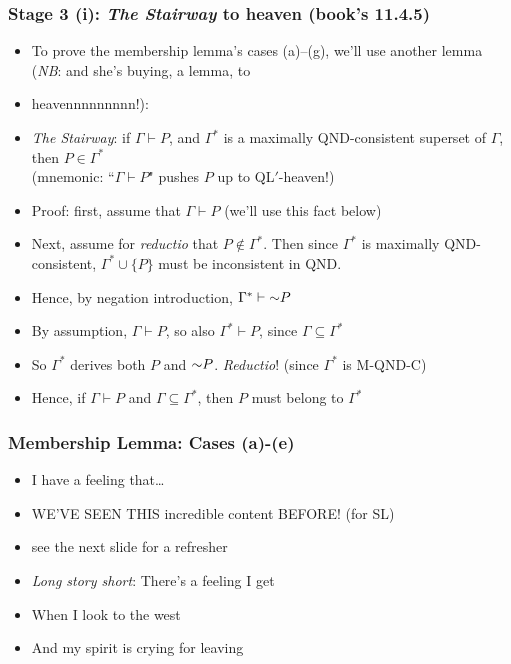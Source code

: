 \begin{frame}
\frametitle{Stage 3 (i): \emph{The Stairway} to heaven (book's 11.4.5)}

\begin{itemize}[<+->]

\item To prove the membership lemma's cases (a)--(g), we'll use another lemma (\textit{NB}: and she's buying, a lemma, to 
\item[]heavennnnnnnnn!):

\item \emph{The Stairway}: if $\Gamma \vdash P$, and $\Gamma^{\ast}$ is a maximally QND-consistent superset of $\Gamma$, then $P \in \Gamma^{\ast}$ \\ (mnemonic: ``$\Gamma\vdash P$" pushes $P$ up to QL$'$-heaven!) %

\item Proof: first, assume that $\Gamma \vdash P$ (we'll use this fact below)
\bi

\item Next, assume for \textit{reductio} that $P \notin \Gamma^{\ast}$. Then since $\Gamma^{\ast}$ is maximally QND-consistent, $\Gamma^{\ast} \cup \{ P\}$ must be \textcolor{OGlyallpink}{inconsistent in QND}. 

\item Hence, by negation introduction, $\Gamma^{\ast} \vdash \enot P$

\item By assumption, $\Gamma \vdash P$, so also $\Gamma^{\ast} \vdash P$, since $\Gamma \subseteq \Gamma^{\ast}$

\item So $\Gamma^{\ast}$ derives both $P$ and $\enot P$. \textit{Reductio}! (since $\Gamma^{\ast}$ is M-QND-C)

\item Hence, if $\Gamma \vdash P$ and $\Gamma \subseteq \Gamma^{\ast}$, then $P$ must belong to $\Gamma^{\ast}$ 
\ei

\end{itemize}
\end{frame}


\begin{frame}
\frametitle{Membership Lemma: Cases (a)-(e)}

\begin{itemize}[<+->]

\item I have a feeling that\dots

\item WE'VE SEEN THIS incredible content BEFORE! (for SL)

\item see the next slide for a refresher 

\item \textit{Long story short}: There's a feeling I get
\item[] When I look to the west
\item[] And my spirit is crying for leaving

\end{itemize}
\end{frame}

